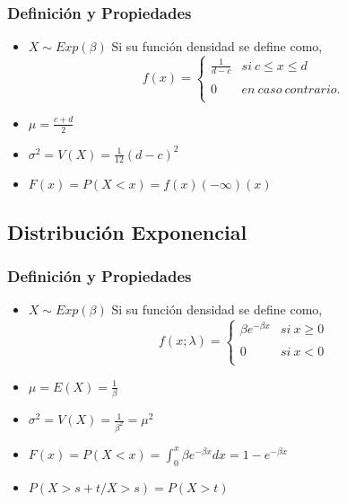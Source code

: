 \documentclass{article}
\begin{document}
\subsubsection*{Definición y Propiedades}
\begin{itemize}
    \item $X\sim Exp(\beta)$ Si su función densidad se define como,
        \[
            f(x)= \left\{ \begin{array}{lc}
                \frac{1}{d-c} &   si\ c \leq x\leq d\\
                         \\ 0 & en\ caso\ contrario.\\
                         \end{array}
               \right.
        \]
    \item $\mu=\frac{c+d}{2}$
    \item $\sigma^{2}=V(X)=\frac{1}{12}(d-c)^{2}$
    \item $F(x)=P(X < x)=f(x)(-\infty)(x)$
\end{itemize}


\subsection{Distribución Exponencial}
\subsubsection*{Definición y Propiedades}
\begin{itemize}
    \item $X\sim Exp(\beta)$ Si su función densidad se define como,
        \[
            f(x;\lambda)= \left\{ \begin{array}{lc}
                                \beta e^{-\beta x} &   si\ x\geq 0\\
                                \\ 0 &  si\ x < 0 \\
                         \end{array}
               \right.
        \]
    \item $\mu=E(X)=\frac{1}{\beta}$
    \item $\sigma^{2}=V(X)=\frac{1}{\beta^{2}}=\mu^{2}$
    \item $F(x)=P(X < x)=\int^{x}_{0}\beta e^{-\beta x}dx=1-e^{-\beta x}$
    \item $P(X > s + t/X > s)=P(X > t)$
\end{itemize}
\end{document}
